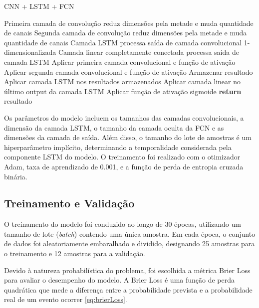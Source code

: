 \documentclass[journal]{IEEEtran}
\begin{document}
\begin{algorithm}
    \caption{CNN + LSTM + FCN}
    \begin{algorithmic}[1]
            \State Primeira camada de convolução reduz dimensões pela metade e muda quantidade de canais
            \State Segunda camada de convolução reduz dimensões pela metade e muda quantidade de canais
            \State Camada LSTM processa saída de camada convolucional 1-dimensionalizada
            \State Camada linear completamente conectada processa saída de camada LSTM
        \EndProcedure
                \State Aplicar primeira camada convolucional e função de ativação
                \State Aplicar segunda camada convolucional e função de ativação
                \State Armazenar resultado
            \EndFor
            \State Aplicar camada LSTM nos resultados armazenados
            \State Aplicar camada linear no último output da camada LSTM
            \State Aplicar função de ativação sigmoide
            \State \textbf{return} resultado
        \EndProcedure
    \end{algorithmic}
\end{algorithm}

Os parâmetros do modelo incluem os tamanhos das camadas convolucionais, a dimensão da camada LSTM, o tamanho da camada oculta da FCN e as dimensões da camada de saída. Além disso, o tamanho do lote de amostras é um hiperparâmetro implícito, determinando a temporalidade considerada pela componente LSTM do modelo. O treinamento foi realizado com o otimizador Adam, taxa de aprendizado de 0.001, e a função de perda de entropia cruzada binária.

\subsection{Treinamento e Validação}

O treinamento do modelo foi conduzido ao longo de 30 épocas, utilizando um tamanho de lote (\textit{batch}) contendo uma única amostra. Em cada época, o conjunto de dados foi aleatoriamente embaralhado e dividido, designando 25 amostras para o treinamento e 12 amostras para a validação.\newline

Devido à natureza probabilística do problema, foi escolhida a métrica Brier Loss para avaliar o desempenho do modelo. A Brier Loss é uma função de perda quadrática que mede a diferença entre a probabilidade prevista e a probabilidade real de um evento ocorrer \ref{eq:brierLoss}.
\end{document}
